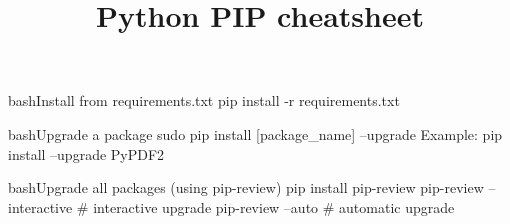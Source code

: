 \documentclass[10pt,a4paper]{article}
\title{\color{w3schools}Python PIP cheatsheet
}
\begin{document}
\maketitle

\small
\begin{multicols}{3}

\thispagestyle{empty}
\scriptsize



\begin{codebox}{bash}{Install from requirements.txt}
pip install -r  requirements.txt

\end{codebox}

\begin{codebox}{bash}{Upgrade a package}
sudo pip install [package_name] --upgrade
Example: pip install --upgrade PyPDF2

\end{codebox}

\begin{codebox}{bash}{Upgrade all packages (using pip-review)}
pip install pip-review
pip-review --interactive # interactive upgrade
pip-review  --auto       # automatic upgrade

\end{codebox}


\AtNextBibliography{\footnotesize}
\printbibliography  
\end{multicols}
\end{document}
